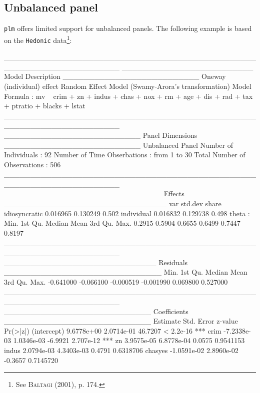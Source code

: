 \documentclass{article}
\begin{document}
\subsection{Unbalanced panel}

\texttt{plm} offers limited support for unbalanced panels. The
following example is based on the \texttt{Hedonic} data\footnote{See \textsc{Baltagi}
  (2001), p. 174.}:

\begin{Schunk}
\begin{Soutput}
______________________________________________________________________ 
_________________________ Model Description __________________________
Oneway (individual) effect
Random Effect Model (Swamy-Arora's transformation)
Model Formula             : mv ~ crim + zn + indus + chas + nox + 
                                rm + age + dis + rad + tax + 
                                ptratio + blacks + lstat
______________________________________________________________________ 
__________________________ Panel Dimensions __________________________
Unbalanced Panel
Number of Individuals        :  92
Number of Time Obserbations  :  from 1 to 30
Total Number of Observations :  506
______________________________________________________________________ 
______________________________ Effects _______________________________
                   var  std.dev share
idiosyncratic 0.016965 0.130249 0.502
individual    0.016832 0.129738 0.498
theta  : 
   Min. 1st Qu.  Median    Mean 3rd Qu.    Max. 
 0.2915  0.5904  0.6655  0.6499  0.7447  0.8197 
______________________________________________________________________ 
_____________________________ Residuals ______________________________
     Min.   1st Qu.    Median      Mean   3rd Qu.      Max. 
-0.641000 -0.066100 -0.000519 -0.001990  0.069800  0.527000 
______________________________________________________________________ 
____________________________ Coefficients ____________________________
               Estimate  Std. Error  z-value  Pr(>|z|)    
(intercept)  9.6778e+00  2.0714e-01  46.7207 < 2.2e-16 ***
crim        -7.2338e-03  1.0346e-03  -6.9921 2.707e-12 ***
zn           3.9575e-05  6.8778e-04   0.0575 0.9541153    
indus        2.0794e-03  4.3403e-03   0.4791 0.6318706    
chasyes     -1.0591e-02  2.8960e-02  -0.3657 0.7145720    

\end{Soutput}
\end{Schunk}
\end{document}
